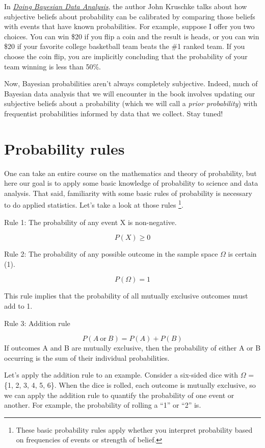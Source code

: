 \documentclass[
]{book}
\begin{document}
In \href{https://sites.google.com/site/doingbayesiandataanalysis/}{\emph{Doing Bayesian Data Analysis}}, the author John Kruschke talks about how subjective beliefs about probability can be calibrated by comparing those beliefs with events that have known probabilities. For example, suppose I offer you two choices. You can win \$20 if you flip a coin and the result is heads, or you can win \$20 if your favorite college basketball team beats the \#1 ranked team. If you choose the coin flip, you are implicitly concluding that the probability of your team winning is less than 50\%.

Now, Bayesian probabilities aren't always completely subjective. Indeed, much of Bayesian data analysis that we will encounter in the book involves updating our subjective beliefs about a probability (which we will call a \emph{prior probability}) with frequentist probabilities informed by data that we collect. Stay tuned!

\section{Probability rules}\label{probability-rules}

One can take an entire course on the mathematics and theory of probability, but here our goal is to apply some basic knowledge of probability to science and data analysis. That said, familiarity with some basic rules of probability is necessary to do applied statistics. Let's take a look at those rules \footnote{These basic probability rules apply whether you interpret probability based on frequencies of events or strength of belief.}.

Rule 1: The probability of any event X is non-negative.

\[
P(X) \geq 0
\]

Rule 2: The probability of any possible outcome in the sample space \(\Omega\) is certain (1).

\[
P(\Omega) = 1
\]

This rule implies that the probability of all mutually exclusive outcomes must add to 1.

Rule 3: Addition rule

\[
P(A\ \text{or}\ B) = P(A) + P(B)
\]
If outcomes A and B are mutually exclusive, then the probability of either A or B occurring is the sum of their individual probabilities.

Let's apply the addition rule to an example. Consider a six-sided dice with \(\Omega\) = \{1, 2, 3, 4, 5, 6\}. When the dice is rolled, each outcome is mutually exclusive, so we can apply the addition rule to quantify the probability of one event or another. For example, the probability of rolling a ``1'' or ``2'' is.
\end{document}
